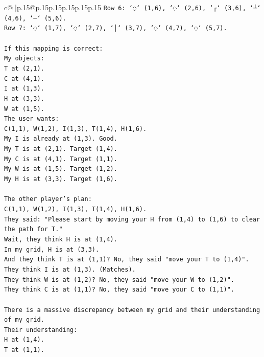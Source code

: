 \documentclass{article}
\begin{document}
{\begin{supertabular}{c@{$\;$}|p{.15\linewidth}@{}p{.15\linewidth}p{.15\linewidth}p{.15\linewidth}p{.15\linewidth}p{.15\linewidth}}
{{{\texttt{Row 6: `◌` (1,6), `◌` (2,6), `┌` (3,6), `┴` (4,6), `─` (5,6).} \\
\texttt{Row 7: `◌` (1,7), `◌` (2,7), `│` (3,7), `◌` (4,7), `◌` (5,7).} \\
\\ 
\texttt{If this mapping is correct:} \\
\texttt{My objects:} \\
\texttt{T at (2,1).} \\
\texttt{C at (4,1).} \\
\texttt{I at (1,3).} \\
\texttt{H at (3,3).} \\
\texttt{W at (1,5).} \\
\texttt{The user wants:} \\
\texttt{C(1,1), W(1,2), I(1,3), T(1,4), H(1,6).} \\
\texttt{My I is already at (1,3). Good.} \\
\texttt{My T is at (2,1). Target (1,4).} \\
\texttt{My C is at (4,1). Target (1,1).} \\
\texttt{My W is at (1,5). Target (1,2).} \\
\texttt{My H is at (3,3). Target (1,6).} \\
\\ 
\texttt{The other player's plan:} \\
\texttt{C(1,1), W(1,2), I(1,3), T(1,4), H(1,6).} \\
\texttt{They said: "Please start by moving your H from (1,4) to (1,6) to clear the path for T."} \\
\texttt{Wait, they think H is at (1,4).} \\
\texttt{In my grid, H is at (3,3).} \\
\texttt{And they think T is at (1,1)? No, they said "move your T to (1,4)".} \\
\texttt{They think I is at (1,3). (Matches).} \\
\texttt{They think W is at (1,2)? No, they said "move your W to (1,2)".} \\
\texttt{They think C is at (1,1)? No, they said "move your C to (1,1)".} \\
\\ 
\texttt{There is a massive discrepancy between my grid and their understanding of my grid.} \\
\texttt{Their understanding:} \\
\texttt{H at (1,4).} \\
\texttt{T at (1,1).} \\
}}}
\end{supertabular}}
\end{document}

